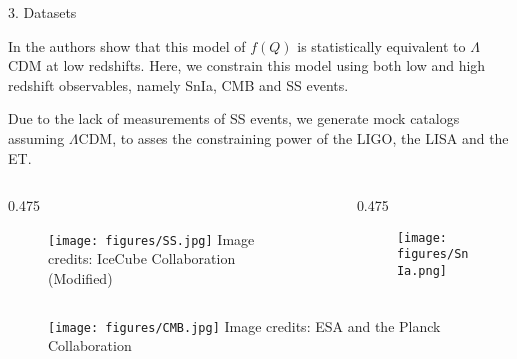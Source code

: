 \begin{block}{3. Datasets}

In \cite{Anagnostopoulos2021} the authors show that this model of $f(Q)$ is statistically equivalent to $\Lambda$CDM at low redshifts. Here, we constrain this model using both low and high redshift observables, namely \gls{SnIa}, \gls{CMB} and \gls{SS} events.

Due to the lack of measurements of \gls{SS} events, we generate mock catalogs assuming $\Lambda$CDM, to asses the constraining power of the \gls{LIGO}, the \gls{LISA} and the \gls{ET}.

\vspace{-0.25cm}
\begin{columns}[T,totalwidth=\colwidth]

\begin{column}{0.475\colwidth}
    \begin{exampleblock}{}
        \begin{figure}[h!]
            \texttt{[image: figures/SS.jpg]}
            \scriptsize{Image credits: IceCube Collaboration (Modified)}
        \end{figure}
    \end{exampleblock}
\end{column}

\begin{column}{0.475\colwidth}
    \begin{exampleblock}{}
        \begin{figure}[h!]
            \texttt{[image: figures/SnIa.png]}
        \end{figure}
    \end{exampleblock}
\end{column}

\end{columns}

\begin{exampleblock}{}
    \begin{figure}[h!]
        \texttt{[image: figures/CMB.jpg]}
        \scriptsize{Image credits: ESA and the Planck Collaboration}
    \end{figure}
\end{exampleblock}

\end{block}